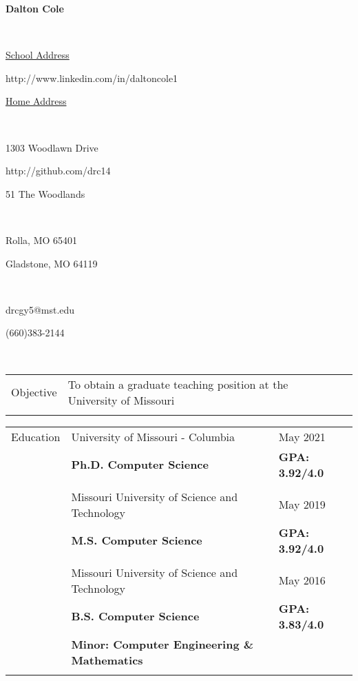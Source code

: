 \documentclass[10.5pt, arial]{article}
\newcommand\textbox[1]{%
  \parbox{.333\textwidth}{#1}%
}
\begin{document}

\noindent\textbox{\hfill}\textbox{\hfil \textbf{Dalton Cole}\hfil}\textbox{\hfill} \\
\noindent\textbox{\underline{School Address}\hfill}\textbox{\hfil http://www.linkedin.com/in/daltoncole1\hfil}\textbox{\hfill \underline{Home Address}} \\
\noindent\textbox{1303 Woodlawn Drive\hfill}\textbox{\hfil http://github.com/drc14\hfil}\textbox{\hfill 51 The Woodlands} \\
\noindent\textbox{Rolla, MO 65401\hfill}\textbox{\hfil \hfil}\textbox{\hfill Gladstone, MO 64119} \\
\noindent\textbox{drcgy5@mst.edu\hfill}\textbox{\hfil \hfil}\textbox{\hfill (660)383-2144} \\
\noindent\makebox[\linewidth]{\rule{\textwidth}{.4pt}} 

\begin{tabular}{p{1.5cm} p{13.2cm} l}
Objective  	& To obtain a graduate teaching position at the University of Missouri		 & 						\\ \\
\end{tabular}

\begin{tabular}{p{1.5cm} p{13.2cm} l}
Education  	& University of Missouri - Columbia				 					& May 2021 				\\
			& \textbf{Ph.D. Computer Science} 									& \textbf{GPA: 3.92/4.0}	\\ \\

			& Missouri University of Science and Technology 					& May 2019 				\\
			& \textbf{M.S. Computer Science}									& \textbf{GPA: 3.92/4.0}	\\ \\

		  	& Missouri University of Science and Technology 					& May 2016 				\\
			& \textbf{B.S. Computer Science} 									& \textbf{GPA: 3.83/4.0} \\
			& \textbf{Minor: Computer Engineering \& Mathematics} 										\\ \\
\end{tabular}
\end{document}
